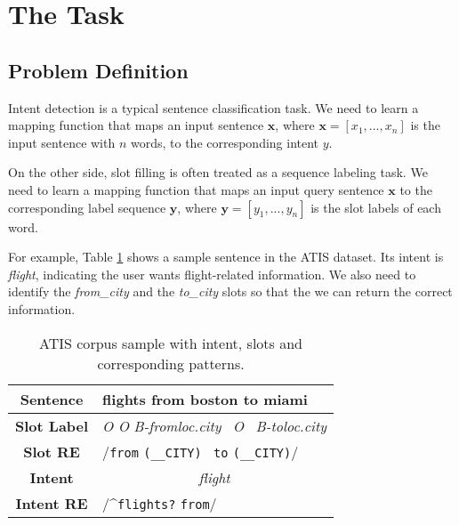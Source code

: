 \section{The Task}
\subsection{Problem Definition}
Intent detection is a typical sentence classification task.
We need to learn a mapping function that maps an input sentence $\textbf{x}$, where $\textbf{x}=[x_{1}, ..., x_{n}]$ is the input sentence with $n$ words, to the corresponding intent $y$.

On the other side, slot filling is often treated as a sequence labeling task. 
We need to learn a mapping function that maps an input query sentence $\textbf{x}$ to the corresponding label sequence $\textbf{y}$, where $\textbf{y}=[y_{1}, ..., y_{n}]$ is the slot labels of each word.

For example, Table \ref{atis_sample} shows a sample sentence in the ATIS dataset. Its intent is \emph{flight}, indicating the user wants flight-related information. We also need to identify the \emph{from\_city} and the \emph{to\_city} slots so that the we can return the correct information.

\begin{table}
\setlength{\tabcolsep}{0.23em}
\centering
\small{
\begin{tabular}{|c|l|}

\hline
\textbf{Sentence} &flights \;\;\;\;\;\;\;\; from \;\;\;\; boston \;\;\;\;\; to \;\;\; miami  \\
\hline
\textbf{Slot Label} &\;\;\; \emph{O} \;\;\;\;\;\;\;\;\;\;\; \emph{O} \; \emph{B-fromloc.city} \, \emph{O} \, \emph{B-toloc.city} \\
\hline
\textbf{Slot RE} & \multicolumn{1}{|l|}{\quad\quad\quad\;\;\;\;\;\;/\texttt{from} \; \texttt{(\_\_CITY)} \, \texttt{to}  \texttt{(\_\_CITY)}/} \\
\hline
\textbf{Intent} &\multicolumn{1}{|c|}{\emph{flight}} \\
\hline
\textbf{Intent RE} & \multicolumn{1}{|l|}{/\textasciicircum \texttt{flights?} \texttt{from}/} \\
\hline
\end{tabular}
}
\caption{ATIS corpus sample with intent, slots and corresponding \RE patterns.}
\label{atis_sample}
\end{table}


